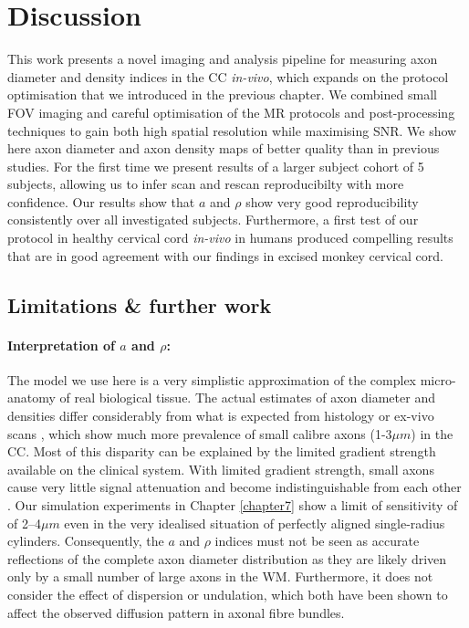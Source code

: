 \section{Discussion}
This work presents a novel imaging and analysis pipeline for measuring axon diameter and density indices in the \gls{CC} \emph{in-vivo}, which expands on the \SFasym{} protocol optimisation that we introduced in the previous chapter. We combined small \gls{FOV} imaging and careful optimisation of the MR protocols and post-processing techniques to gain both high spatial resolution while maximising \gls{SNR}. We show here axon diameter and axon density maps of better quality than in previous studies. For the first time we present results of a larger subject cohort of 5 subjects, allowing us to infer scan and rescan reproducibilty with more confidence. Our results show that $a$ and $\rho$ show very good reproducibility consistently over all investigated subjects. Furthermore, a first test of our protocol in healthy cervical cord \emph{in-vivo} in humans produced compelling results that are in good agreement with our findings in excised monkey cervical cord.

\subsection{Limitations \& further work}
\paragraph{Interpretation of $a$ and $\rho$: }The model we use here is a very simplistic approximation of the complex micro-anatomy of real biological tissue. The actual estimates of axon diameter and densities differ considerably from what is expected from histology or ex-vivo scans \citep{Alexander:2010}, which show much more prevalence of small calibre axons (1-3$\mu m$) in the \gls{CC}. Most of this disparity can be explained by the limited gradient strength available on the clinical system.  With limited gradient strength, small axons cause very little signal attenuation and become indistinguishable from each other \citep{Latt:2007,Yeh:2010}. Our simulation experiments in Chapter \ref{chapter7} show a limit of sensitivity of of 2--4$\mu m$ even in the very idealised situation of perfectly aligned single-radius cylinders. Consequently, the $a$ and $\rho$ indices must not be seen as accurate reflections of the complete axon diameter distribution as they are likely driven only by a small number of large axons in the WM. Furthermore, it does not consider the effect of dispersion\citep{Zhang:2011} or undulation\citep{Nilsson:2012}, which both have been shown to affect the observed diffusion pattern in axonal fibre bundles. 

